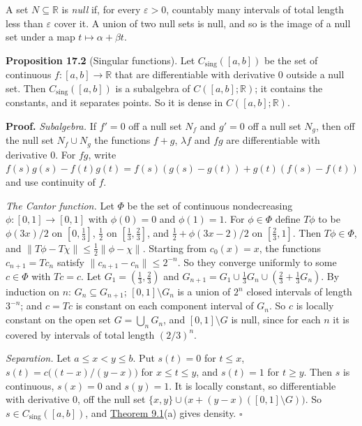 \documentclass[
  english,
  11pt,
  a4paper,
]{article}
\begin{document}
A set \(N\subseteq\mathbb R\) is \emph{null} if, for every
\(\varepsilon>0\), countably many intervals of total length less than
\(\varepsilon\) cover it. A union of two null sets is null, and so is
the image of a null set under a map \(t\mapsto\alpha+\beta t\).

\textbf{Proposition 17.2} (Singular functions). Let
\(C_{\mathrm{sing}}([a,b])\) be the set of continuous
\(f:[a,b]\to\mathbb R\) that are differentiable with derivative \(0\)
outside a null set. Then \(C_{\mathrm{sing}}([a,b])\) is a subalgebra of
\(C([a,b];\mathbb R)\); it contains the constants, and it separates
points. So it is dense in \(C([a,b];\mathbb R)\).

\textbf{Proof.} \emph{Subalgebra.} If \(f'=0\) off a null set \(N_f\)
and \(g'=0\) off a null set \(N_g\), then off the null set
\(N_f\cup N_g\) the functions \(f+g\), \(\lambda f\) and \(fg\) are
differentiable with derivative \(0\). For \(fg\), write
\(f(s)g(s)-f(t)g(t)=f(s)(g(s)-g(t))+g(t)(f(s)-f(t))\) and use continuity
of \(f\).

\emph{The Cantor function.} Let \(\Phi\) be the set of continuous
nondecreasing \(\phi:[0,1]\to[0,1]\) with \(\phi(0)=0\) and
\(\phi(1)=1\). For \(\phi\in\Phi\) define \(T\phi\) to be \(\phi(3x)/2\)
on \([0,\frac13]\), \(\frac12\) on \([\frac13,\frac23]\), and
\(\frac12+\phi(3x-2)/2\) on \([\frac23,1]\). Then \(T\phi\in\Phi\), and
\(\|T\phi-T\chi\|\leq\frac12\|\phi-\chi\|\). Starting from \(c_0(x)=x\),
the functions \(c_{n+1}=Tc_n\) satisfy \(\|c_{n+1}-c_n\|\leq2^{-n}\). So
they converge uniformly to some \(c\in\Phi\) with \(Tc=c\). Let
\(G_1=(\frac13,\frac23)\) and
\(G_{n+1}=G_1\cup\frac13G_n\cup(\frac23+\frac13G_n)\). By induction on
\(n\): \(G_n\subseteq G_{n+1}\); \([0,1]\setminus G_n\) is a union of
\(2^n\) closed intervals of length \(3^{-n}\); and \(c=Tc\) is constant
on each component interval of \(G_n\). So \(c\) is locally constant on
the open set \(G=\bigcup_nG_n\), and \([0,1]\setminus G\) is null, since
for each \(n\) it is covered by intervals of total length \((2/3)^n\).

\emph{Separation.} Let \(a\leq x<y\leq b\). Put \(s(t)=0\) for
\(t\leq x\), \(s(t)=c\bigl((t-x)/(y-x)\bigr)\) for \(x\leq t\leq y\),
and \(s(t)=1\) for \(t\geq y\). Then \(s\) is continuous, \(s(x)=0\) and
\(s(y)=1\). It is locally constant, so differentiable with derivative
\(0\), off the null set
\(\{x,y\}\cup\bigl(x+(y-x)([0,1]\setminus G)\bigr)\). So
\(s\in C_{\mathrm{sing}}([a,b])\), and
\hyperlink{the-stone-weierstrass-theorem-for-functions-vanishing-at-infinity--oa-fnd-sw-07}{Theorem
9.1}(a) gives density. \(\square\)
\end{document}
